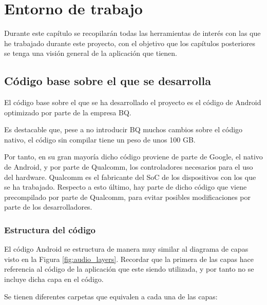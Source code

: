 \chapter{Entorno de trabajo}
Durante este capítulo se recopilarán todas las herramientas de interés con las que he trabajado durante este proyecto, con el objetivo que los capítulos posteriores se tenga una visión general de la aplicación que tienen.

\section{Código base sobre el que se desarrolla}
El código base sobre el que se ha desarrollado el proyecto es el código de Android optimizado por parte de la empresa BQ.

Es destacable que, pese a no introducir BQ muchos cambios sobre el código nativo, el código sin compilar tiene un peso de unos 100 \gls{GB}.

Por tanto, en su gran mayoría dicho código proviene de parte de Google, el nativo de Android, y por parte de Qualcomm, los controladores necesarios para el uso del hardware. Qualcomm es el fabricante del \gls{SoC} de los dispositivos con los que se ha trabajado. Respecto a esto último, hay parte de dicho código que viene precompilado por parte de Qualcomm, para evitar posibles modificaciones por parte de los desarrolladores.


\subsection{Estructura del código}
El código Android se estructura de manera muy similar al diagrama de capas visto en la Figura \ref{fig:audio_layers}. Recordar que la primera de las capas hace referencia al código de la aplicación que este siendo utilizada, y por tanto no se incluye dicha capa en el código.

Se tienen diferentes carpetas que equivalen a cada una de las capas:

